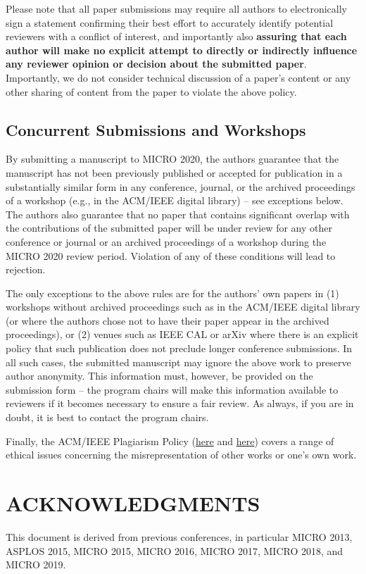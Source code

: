 \documentclass{sig-alternate}
\begin{document}
Please note that all paper submissions may require all authors to electronically sign a statement confirming their best effort to accurately identify potential reviewers with a conflict of interest, and importantly also {\bf assuring that each author will make no explicit attempt to directly or indirectly influence any reviewer opinion or decision about the submitted paper}. Importantly, we do not consider technical discussion of a paper's content or any other sharing of content from the paper to violate the above policy.


\subsection{Concurrent Submissions and Workshops}

By submitting a manuscript to MICRO 2020, the authors guarantee that the manuscript has not been previously published or accepted for publication in a substantially similar form in any conference, journal, or the archived proceedings of a workshop (e.g., in the ACM/IEEE digital library) -- see exceptions below. The authors also guarantee that no paper that contains significant overlap with the contributions of the submitted paper will be under review for any other conference or journal or an archived proceedings of a workshop during the MICRO 2020 review period. Violation of any of these conditions will lead to rejection.

The only exceptions to the above rules are for the authors' own papers in (1) workshops without archived proceedings such as in the ACM/IEEE digital library (or where the authors chose not to have their paper appear in the archived proceedings), or (2) venues such as IEEE CAL or arXiv where there is an explicit policy that such publication does not preclude longer conference submissions.  In all such cases, the submitted manuscript may ignore the above work to preserve author anonymity. This information must, however, be provided on the submission form -- the program chairs will make this information available to reviewers if it becomes necessary to ensure a fair review.  As always, if you are in doubt, it is best to contact the program chairs.


Finally, the ACM/IEEE Plagiarism Policy (\href{http://www.acm.org/publications/policies/plagiarism_policy}{here} and \href{https://www.ieee.org/publications_standards/publications/rights/plagiarism_FAQ.html}{here}) covers a range of ethical issues concerning the misrepresentation of other works or one's own work.

\section*{ACKNOWLEDGMENTS}
This document is derived from previous conferences, in particular MICRO 2013, ASPLOS 2015, MICRO 2015, MICRO 2016, MICRO 2017, MICRO 2018, and MICRO 2019.






\end{document}
